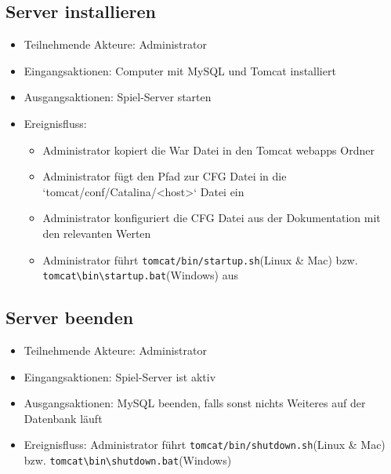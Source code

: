 \documentclass[a4paper]{scrreprt}
\begin{document}
    \subsection{Server installieren}
    \begin{itemize}
        \item Teilnehmende Akteure: \Gls{Administrator} 
        \item Eingangsaktionen: Computer mit MySQL und Tomcat installiert
        \item Ausgangsaktionen: \Gls{Spiel-Server} starten
        \item Ereignisfluss: 
            \begin{itemize}
                \item \Gls{Administrator} kopiert die War Datei in den Tomcat webapps Ordner
                \item \Gls{Administrator} fügt den Pfad zur CFG Datei in die `tomcat/conf/Catalina/<host>` Datei ein
                \item \Gls{Administrator} konfiguriert die CFG Datei aus der Dokumentation mit den relevanten Werten
                \item \Gls{Administrator} führt \texttt{tomcat/bin/startup.sh}(Linux \& Mac) bzw. \texttt{tomcat\textbackslash bin\textbackslash startup.bat}(Windows) aus
            \end{itemize}
    \end{itemize}

    \subsection{Server beenden}
    \begin{itemize}
        \item Teilnehmende Akteure: \Gls{Administrator}
        \item Eingangsaktionen: \Gls{Spiel-Server} ist aktiv
        \item Ausgangsaktionen: MySQL beenden, falls sonst nichts Weiteres auf der Datenbank läuft
        \item Ereignisfluss: \Gls{Administrator} führt \texttt{tomcat/bin/shutdown.sh}(Linux \& Mac) bzw. \texttt{tomcat\textbackslash bin\textbackslash shutdown.bat}(Windows)
    \end{itemize}
\end{document}
